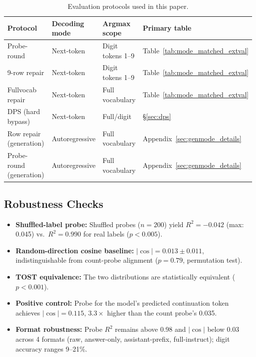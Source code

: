 \documentclass{article}
\begin{document}
\begin{table}[h]
\caption{Evaluation protocols used in this paper.}
\label{tab:protocol_map}
\begin{tabular}{llll}
\toprule
Protocol & Decoding mode & Argmax scope & Primary table \\
\midrule
Probe-round & Next-token & Digit tokens 1--9 & Table~\ref{tab:mode_matched_extval} \\
9-row repair & Next-token & Digit tokens 1--9 & Table~\ref{tab:mode_matched_extval} \\
Fullvocab repair & Next-token & Full vocabulary & Table~\ref{tab:mode_matched_extval} \\
DPS (hard bypass) & Next-token & Full/digit & \S\ref{sec:dps} \\
Row repair (generation) & Autoregressive & Full vocabulary & Appendix~\ref{sec:genmode_details} \\
Probe-round (generation) & Autoregressive & Full vocabulary & Appendix~\ref{sec:genmode_details} \\
\bottomrule
\end{tabular}
\end{table}

\subsection{Robustness Checks}
\label{sec:robustness_checks}

\begin{itemize}
\item \textbf{Shuffled-label probe:} Shuffled probes ($n{=}200$) yield $R^2 =
  -0.042$ (max: 0.045) vs.\ $R^2 = 0.990$ for real labels ($p < 0.005$).
\item \textbf{Random-direction cosine baseline:} $|\cos| = 0.013 \pm 0.011$,
  indistinguishable from count-probe alignment ($p = 0.79$, permutation test).
\item \textbf{TOST equivalence:} The two distributions are statistically
  equivalent ($p < 0.001$).
\item \textbf{Positive control:} Probe for the model's predicted continuation
  token achieves $|\cos| = 0.115$, $3.3\times$ higher than the count probe's
  0.035.
\item \textbf{Format robustness:} Probe $R^2$ remains above 0.98 and $|\cos|$
  below 0.03 across 4 formats (raw, answer-only, assistant-prefix,
  full-instruct); digit accuracy ranges 9--21\%.
\end{itemize}
\end{document}
